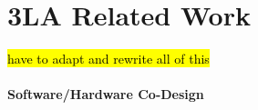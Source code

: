\section{3LA Related Work}

\hl{have to adapt and rewrite all of this}

%



%
%


\paragraph{Software/Hardware Co-Design}

